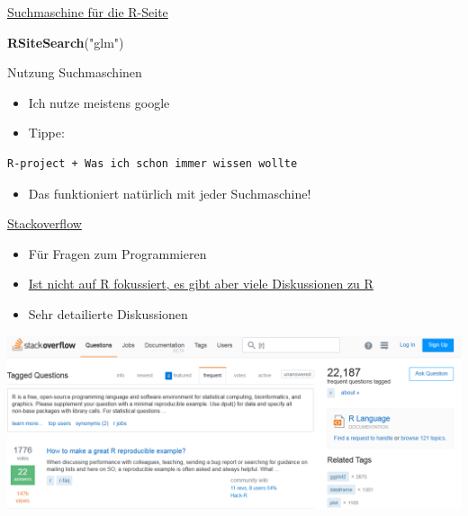 \documentclass[ignorenonframetext,]{beamer}
\newenvironment{Shaded}{}{}
\newcommand{\KeywordTok}[1]{\textcolor[rgb]{0.00,0.44,0.13}{\textbf{{#1}}}}
\newcommand{\StringTok}[1]{\textcolor[rgb]{0.25,0.44,0.63}{{#1}}}
\newcommand{\NormalTok}[1]{{#1}}
\providecommand{\tightlist}{%
\setlength{\itemsep}{0pt}\setlength{\parskip}{0pt}}
\begin{document}
\begin{frame}[fragile]{\href{http://search.r-project.org/cgi-bin/namazu.cgi?query=glm\&max=20\&result=normal\&sort=score\&idxname=functions\&idxname=vignettes\&idxname=views}{Suchmaschine
für die R-Seite}}

\begin{Shaded}
\begin{Highlighting}[]
\KeywordTok{RSiteSearch}\NormalTok{(}\StringTok{"glm"}\NormalTok{)}
\end{Highlighting}
\end{Shaded}

\end{frame}

\begin{frame}[fragile]{Nutzung Suchmaschinen}

\begin{itemize}
\tightlist
\item
  Ich nutze meistens google
\item
  Tippe:
\end{itemize}

\begin{verbatim}
R-project + Was ich schon immer wissen wollte
\end{verbatim}

\begin{itemize}
\tightlist
\item
  Das funktioniert natürlich mit jeder Suchmaschine!
\end{itemize}

\end{frame}

\begin{frame}{\href{http://stackoverflow.com/}{Stackoverflow}}

\begin{itemize}
\tightlist
\item
  Für Fragen zum Programmieren
\item
  \href{https://stackoverflow.com/tags/r/info}{Ist nicht auf R
  fokussiert, es gibt aber viele Diskussionen zu R}
\item
  Sehr detailierte Diskussionen
\end{itemize}

\includegraphics{./tex2pdf.956/b355b991b8b67437045666b49510802f4d9ef989.png}

\end{frame}
\end{document}
